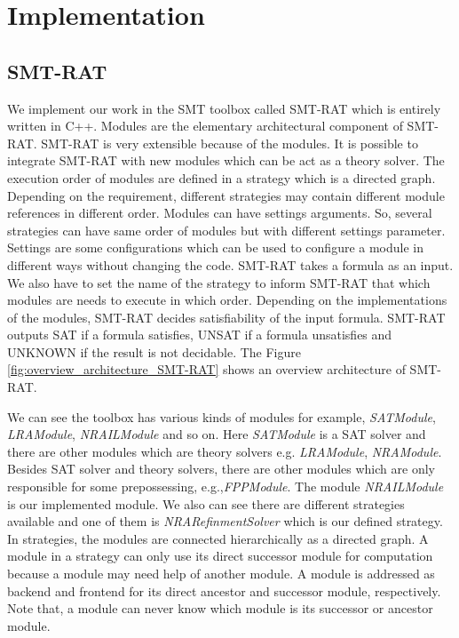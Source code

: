 \chapter{Implementation}
\label{chap:implementation}

\section{SMT-RAT}
\label{sec:smt-rat}
We implement our work in the SMT toolbox called SMT-RAT which is entirely written in C++.
Modules are the elementary architectural component of SMT-RAT.
SMT-RAT is very extensible because of the modules.
It is possible to integrate SMT-RAT with new modules which can be act as a theory solver.
The execution order of modules are defined in a strategy which is a directed graph.
Depending on the requirement, different strategies may contain different module references in different order.
Modules can have settings arguments.
So, several strategies can have same order of modules but with different settings parameter.
Settings are some configurations which can be used to configure a module in different ways without changing the code.
SMT-RAT takes a formula as an input.
We also have to set the name of the strategy to inform SMT-RAT that which modules are needs to execute in which order.
Depending on the implementations of the modules, SMT-RAT decides satisfiability of the input formula.
SMT-RAT outputs SAT if a formula satisfies, UNSAT if a formula unsatisfies and UNKNOWN if the result is not decidable.
The Figure \ref{fig:overview_architecture_SMT-RAT} shows an overview architecture of SMT-RAT.\newline

\noindent We can see the toolbox has various kinds of modules for example, \textit{SATModule}, \textit{LRAModule}, \textit{NRAILModule} and so on.
Here \textit{SATModule} is a SAT solver and there are other modules which are theory solvers e.g. \textit{LRAModule}, \textit{NRAModule}.
Besides SAT solver and theory solvers, there are other modules which are only responsible for some prepossessing, e.g.,\textit{FPPModule}.
The module \textit{NRAILModule} is our implemented module.
We also can see there are different strategies available and one of them is \textit{NRARefinmentSolver} which is our defined strategy.
In strategies, the modules are connected hierarchically as a directed graph.
A module in a strategy can only use its direct successor module for computation because a module may need help of another module.
A module is addressed as backend and frontend for its direct ancestor and successor module, respectively.
Note that, a module can never know which module is its successor or ancestor module.\newline

